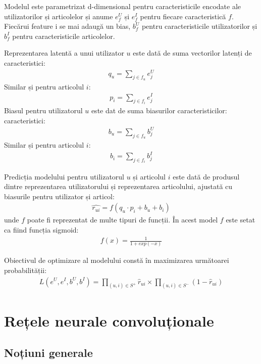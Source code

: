 Modelul este parametrizat d-dimensional pentru caracteristicile encodate ale utilizatorilor și articolelor și anume $e_f^U$ și $e_f^I$ pentru fiecare caracteristică $f$. Fiecărui feature i se mai adaugă un bias, $b_f^U$ pentru caracteristicile utilizatorilor și $b_f^I$ pentru caracteristicile articolelor.

Reprezentarea latentă a unui utilizator $u$ este dată de suma vectorilor latenți de caracteristici:
\begin{align}
	q_u = \sum_{j \in f_u} e_j^U
\end{align}
Similar și pentru articolul $i$:
\begin{align}
	p_i = \sum_{j \in f_i} e_j^I
\end{align}
Biasul pentru utilizatorul $u$ este dat de suma biasurilor caracteristicilor:
caracteristici:
\begin{align}
	b_u = \sum_{j \in f_u} b_j^U
\end{align}
Similar și pentru articolul $i$:
\begin{align}
	b_i = \sum_{j \in f_i} b_j^I
\end{align}

Predicția modelului pentru utilizatorul $u$ și articolul $i$ este dată de produsul dintre reprezentarea utilizatorului și reprezentarea articolului, ajustată cu biasurile pentru utilizator și articol:
\begin{align}
	\hat{r_{ui}} = f(q_u \cdot p_i + b_u + b_i)
\end{align}
unde $f$ poate fi reprezentat de multe tipuri de funcții. În acest model $f$ este setat ca fiind funcția sigmoid:
\begin{align}
	f(x) = \frac{1}{1 + exp(-x)}
\end{align}

Obiectivul de optimizare al modelului constă în maximizarea următoarei probabilității:
\begin{align}
	L(e^U, e^I, b^U, b^I) = \prod_{(u,i) \in S^+} \hat{r}_{ui} \times \prod_{(u,i) \in S^-} (1 -\hat{r}_{ui})
\end{align}

\section{Rețele neurale convoluționale}

\subsection{Noțiuni generale}

